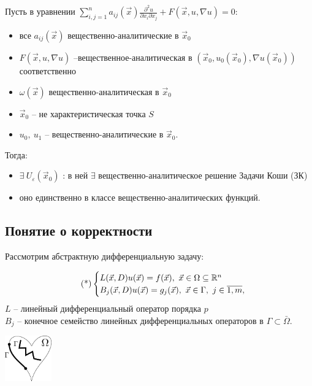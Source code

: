 \documentclass[../main.tex]{subfiles}
\begin{document}
\begin{theorem}[Ковалевской]
Пусть в уравнении $\displaystyle\sum\limits_{i,j=1}^{n} a_{ij}(\vec{x})\frac{\partial^2u}{\partial x_i\partial x_j} + F(\vec{x}, u, \nabla u) = 0$:
\begin{itemize}[nolistsep, noitemsep]
\item все $a_{ij}(\vec{x})$ вещественно-аналитические в $\vec{x}_0$ 
\item $F(\vec{x}, u, \nabla u)$ --вещественное-аналитическая в $(\vec{x}_0, u_0(\vec{x}_0), \nabla u(\vec{x}_0))$ соответственно 
\item $\omega(\vec{x})$ вещественно-аналитическая в $\vec{x}_0$
\item $\vec{x}_0$ -- не характеристическая точка $S$
\item $u_0,\ u_1$ -- вещественно-аналитические в $\vec{x}_0$.
\end{itemize}
Тогда: 
\begin{itemize}[nolistsep, noitemsep]
\item $\exists\: U_{\varepsilon}(\vec{x}_0)$ : в ней $\exists$ вещественно-аналитическое решение Задачи Коши (ЗК)
\item оно единственно в классе вещественно-аналитических функций.
\end{itemize}
\end{theorem}

\subsection*{Понятие о корректности}

Рассмотрим абстрактную дифференциальную задачу:

\begin{equation}
\label{eq::2::diff}
\tag{*}
\begin{cases} L(\vec{x}, D)u(\vec{x}) = f(\vec{x}),\ \vec{x} \in \Omega \subseteq \R^n  \\
B_j(\vec{x},D) u(\vec{x}) = g_j(\vec{x}),\ \vec{x}\in \Gamma,\ j\in\overline{1,m},
\end{cases}
\end{equation}
$L$ -- линейный дифференциальный оператор порядка $p$\\
$B_j$ -- конечное семейство линейных дифференциальных операторов в $\Gamma \subset \bar{\Omega}$.

\begin{center}
\includegraphics[width=0.15\textwidth]{pic 2_3.pdf}
\end{center}
\end{document}

